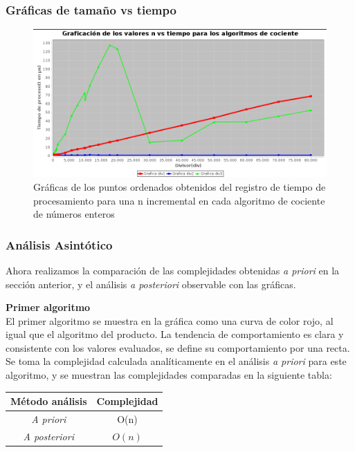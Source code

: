 \documentclass{report}
\begin{document}
        \subsubsection*{Gráficas de tamaño vs tiempo}
                
            \begin{figure}[!h]
                \centering
                \includegraphics[width=20cm]{Imagenes/ResultadosExperimentalesCocientes.png}
                \caption{Gráficas de los puntos ordenados obtenidos del registro de tiempo de procesamiento para una n incremental en cada algoritmo de cociente de números enteros}
            \end{figure}
        \subsubsection*{Análisis Asintótico}
            Ahora realizamos la comparación de las complejidades obtenidas \textit{a priori} en la sección anterior, y el análisis \textit{a posteriori} observable con las gráficas.\\
            
            \hfill \break
            
            \textbf{Primer algoritmo}\\
                El primer algoritmo se muestra en la gráfica como una curva de color rojo, al igual que el algoritmo del producto. La tendencia de comportamiento es clara y consistente con los valores evaluados, se define su comportamiento por una recta.\\
                Se toma la complejidad calculada analíticamente en el análisis \textit{a priori} para este algoritmo, y se muestran las complejidades comparadas en la siguiente tabla:
                
                \begin{table}[h!]
                    \centering
                    \begin{tabular}{c | c}
                        Método análisis & Complejidad \\ \hline
                        \textit{A priori} & O(n)\\
                        \textit{A posteriori} & $O(n)$\\
                    \end{tabular}
                \end{table}
                
\end{document}
